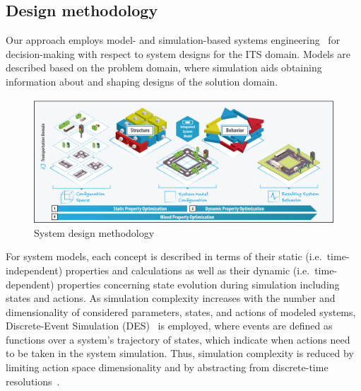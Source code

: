 \documentclass[a4paper,twoside]{article}
\begin{document}
	
	\subsection{Design methodology}
	\label{sec:methodology}
	
	Our approach employs model- and simulation-based systems engineering~\cite{gianni2014modeling} for decision-making with respect to system designs for the ITS domain.
	Models are described based on the problem domain, where simulation aids obtaining information about and shaping designs of the solution domain.
	
	\begin{figure}[!ht]
		\centering
		\includegraphics[width=1.0\columnwidth]{property_optimization.png}
		\caption{System design methodology}
		\label{fig:concept}
	\end{figure}
	
	For system models, each concept is described in terms of their static (i.e.\ time-independent) properties and calculations as well as their dynamic (i.e.\ time-dependent) properties concerning state evolution during simulation including states and actions.
	As simulation complexity increases with the number and dimensionality of considered parameters, states, and actions of modeled systems, Discrete-Event Simulation (DES)~\cite{fishman2001discrete} is employed, where events are defined as functions over a system's trajectory of states, which indicate when actions need to be taken in the system simulation.
	Thus, simulation complexity is reduced by limiting action space dimensionality and by abstracting from discrete-time resolutions~\cite{ascher2023discrete}.
	
\end{document}

